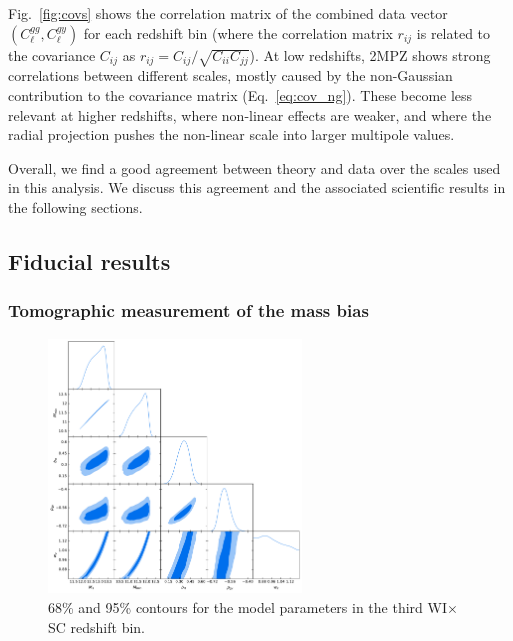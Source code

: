 \documentclass[useAMS,usenatbib]{mn2e}
\begin{document}
    Fig.\!~\ref{fig:covs} shows the correlation matrix of the combined data vector $(C^{gg}_\ell,C^{gy}_\ell)$ for each redshift bin (where the correlation matrix $r_{ij}$ is related to the covariance $C_{ij}$ as $r_{ij}=C_{ij}/\sqrt{C_{ii}C_{jj}}$). At low redshifts, 2MPZ shows strong correlations between different scales, mostly caused by the non-Gaussian contribution to the covariance matrix (Eq.\!~\ref{eq:cov_ng}). These become less relevant at higher redshifts, where non-linear effects are weaker, and where the radial projection pushes the non-linear scale into larger multipole values.
    
    Overall, we find a good agreement between theory and data over the scales used in this analysis. We discuss this agreement and the associated scientific results in the following sections.

  \subsection{Fiducial results}\label{ssec:results.fid}  
    
    \subsubsection{Tomographic measurement of the mass bias}\label{ssec:results.fid.1mb}

      \begin{figure}
        \centering
        \includegraphics[width=0.6\textwidth]{fiducial_wisc3.pdf}
        \caption{68\% and 95\% contours for the model parameters in the third WI$\times$SC redshift bin.}
        \label{fig:triangle}
      \end{figure}
\end{document}
